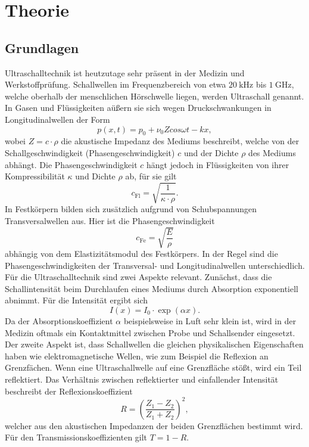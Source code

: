 \section{Theorie}
\label{sec:Theorie}


\subsection{Grundlagen}
Ultraschalltechnik ist heutzutage sehr präsent in der Medizin und Werkstoffprüfung.
Schallwellen im Frequenzbereich von etwa $\SI{20}{\kilo\hertz}$ bis $\SI{1}{\giga\hertz}$, welche oberhalb der menschlichen Hörschwelle liegen, werden Ultraschall genannt.
In Gasen und Flüssigkeiten aüßern sie sich wegen Druckschwankungen in Longitudinalwellen der Form
\begin{equation}
  p(x,t) = p_0 + \nu_0 Z cos{\omega t -kx},
\end{equation}
wobei $Z = c \cdot \rho$ die akustische Impedanz des Mediums beschreibt, welche von der Schallgeschwindigkeit (Phasengeschwindigkeit) $c$ und der Dichte $\rho$ des Mediums abhängt.
Die Phasengeschwindigkeit $c$ hängt jedoch in Flüssigkeiten von ihrer Kompressibilität $\kappa$ und Dichte $\rho$ ab, für sie gilt
\begin{equation}
  c_{\text{Fl}} = \sqrt{\frac{1}{\kappa \cdot \rho}}.
\end{equation}
In Festkörpern bilden sich zusätzlich aufgrund von Schubspannungen Transversalwellen aus.
Hier ist die Phasengeschwindigkeit
\begin{equation}
  c_{\text{Fe}} = \sqrt{\frac{E}{\rho}}
\end{equation}
abhängig von dem Elastizitätsmodul des Festkörpers.
In der Regel sind die Phasengeschwindigkeiten der Transversal- und Longitudinalwellen unterschiedlich.\\
Für die Ultraschalltechnik sind zwei Aspekte relevant.
Zunächst, dass die Schallintensität beim Durchlaufen eines Mediums durch Absorption exponentiell abnimmt.
Für die Intensität ergibt sich
\begin{equation}
  I(x) = I_0 \cdot \exp(\alpha x).
\end{equation}
Da der Absorptionskoeffizient $\alpha$ beispielsweise in Luft sehr klein ist, wird in der Medizin oftmals ein Kontaktmittel zwischen Probe und Schallsender eingesetzt.\\
Der zweite Aspekt ist, dass Schallwellen die gleichen physikalischen Eigenschaften haben wie elektromagnetische Wellen, wie zum Beispiel die Reflexion an Grenzfächen.
Wenn eine Ultraschallwelle auf eine Grenzfläche stößt, wird ein Teil reflektiert.
Das Verhältnis zwischen reflektierter und einfallender Intensität beschreibt der Reflexionskoeffizient
\begin{equation}
  R = \left(\frac{Z_1-Z_2}{Z_1+Z_2}\right)^2,
\end{equation}
welcher aus den akustischen Impedanzen der beiden Grenzflächen bestimmt wird.
Für den Transmissionskoeffizienten gilt $T = 1 - R$.

